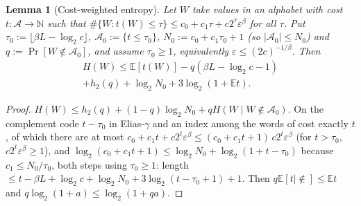 \documentclass[aps,prx,twocolumn,superscriptaddress,nofootinbib,longbibliography]{revtex4-2}
\theoremstyle{plain}
\newtheorem{lemma}{Lemma}
\theoremstyle{definition}
\theoremstyle{remark}
\newcommand{\E}{\mathbb{E}}
\begin{document}
\begin{lemma}[Cost-weighted entropy]\label{lem:cost}
Let $W$ take values in an alphabet with cost $t:\mathcal A\to\mathbb N$ such that $\#\{W:t(W)\le\tau\}\le c_0+c_1\tau+c2^\tau\varepsilon^\beta$ for all $\tau$. Put $\tau_0:=\lfloor\beta L-\log_2c\rfloor$, $\mathcal A_0:=\{t\le\tau_0\}$, $N_0:=c_0+c_1\tau_0+1$ (so $|\mathcal A_0|\le N_0$) and $q:=\Pr[W\notin\mathcal A_0]$, and assume $\tau_0\ge1$, equivalently $\varepsilon\le(2c)^{-1/\beta}$. Then
\begin{multline}
H(W)\le\E[t(W)]-q(\beta L-\log_2c-1)\\
+h_2(q)+\log_2N_0+3\log_2(1+\E t).
\end{multline}
\end{lemma}
\begin{proof}
$H(W)\le h_2(q)+(1-q)\log_2N_0+qH(W\mid W\notin\mathcal A_0)$. On the complement code $t-\tau_0$ in Elias-$\gamma$ and an index among the words of cost exactly $t$, of which there are at most $c_0+c_1t+c2^t\varepsilon^\beta\le(c_0+c_1t+1)\,c2^t\varepsilon^\beta$ (for $t>\tau_0$, $c2^t\varepsilon^\beta\ge1$), and $\log_2(c_0+c_1t+1)\le\log_2N_0+\log_2(1+t-\tau_0)$ because $c_1\le N_0/\tau_0$, both steps using $\tau_0\ge1$: length $\le t-\beta L+\log_2c+\log_2N_0+3\log_2(t-\tau_0+1)+1$. Then $q\E[t\mid\notin]\le\E t$ and $q\log_2(1+a)\le\log_2(1+qa)$.
\end{proof}
\end{document}
